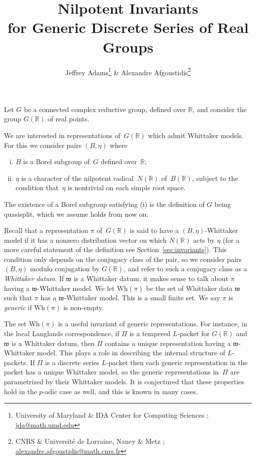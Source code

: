 \documentclass[10pt,leqno]{article}
\numberwithin{equation}{section}
\newcommand{\R}{\mathbb R}
\newcommand{\w}{\mathfrak w}
\newcommand{\Wh}{\mathrm{Wh}}
\begin{document}
\title{Nilpotent Invariants \\ for Generic Discrete Series of Real Groups}
\author{Jeffrey Adams\footnote{University of Maryland \& IDA Center for Computing Sciences ; \url{jda@math.umd.edu}} {} \& Alexandre Afgoustidis\footnote{CNRS \& Université de Lorraine, Nancy \& Metz ; \url{alexandre.afgoustidis@math.cnrs.fr}}}
\date{}

\maketitle


Let $G$ be a connected complex reductive group, defined over $\R$, and consider the group $G(\R)$ of real points. 

We are interested in representations of~$G(\R)$ which admit Whittaker models. For this we consider pairs $(B,\eta)$ where 
\begin{enumerate}[(i)]
\item $B$ is a Borel subgroup of~$G$ defined over~$\R$;
\item $\eta$ is a character of the nilpotent radical~$N(\R)$ of~$B(\R)$, subject to the condition that~$\eta$ is nontrivial on each simple root space.
\end{enumerate}
The existence of a Borel subgroup satisfying (i) is the definition of $G$ being quasisplit, which we assume holds from now on.

Recall that a representation $\pi$ of~$G(\R)$ is said to {have a $(B,\eta)$-Whittaker model} if it has a nonzero distribution vector on which $N(\R)$ acts by $\eta$ (for a more careful statement of the definition see Section~\ref{sec:invariants}).
This condition only depends on the conjugacy class of the pair, 
so we  consider pairs $(B,\eta)$ modulo conjugation by $G(\R)$, and refer to such a conjugacy class
as a {\it Whittaker datum}.
If $\w$ is a Whittaker datum, it makes sense to talk about $\pi$ having a $\w$-Whittaker model. We let $\Wh(\pi)$  be the set of
Whittaker data $\w$ such that $\pi$ has a $\w$-Whittaker model. This is a small finite set.
We say $\pi$ is {\it generic} if $\Wh(\pi)$ is non-empty.

The set $\Wh(\pi)$ is
a useful invariant of generic representations.
For instance, in the local Langlands correspondence, if $\Pi$ is a tempered $L$-packet for $G(\R)$ and $\w$ is a Whittaker datum, then $\Pi$ contains a unique representation
having a $\w$-Whittaker model. This plays a role in describing the internal structure of $L$-packets.
If $\Pi$ is a discrete series $L$-packet then each generic representation in the packet has a unique
Whittaker model, so the generic representations in~$\Pi$ are parametrized by their Whittaker models.
It is conjectured that these properties hold in the $p$-adic case as well, and this is known in many cases.
\end{document}
